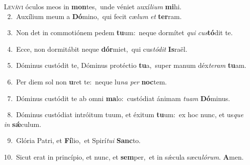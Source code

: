 \lettrine{\initial\textcolor{\initialcolor}{L}}{evávi} óculos meos in \textbf{mon}\-tes,~\star unde véniet auxí\-\textit{li}\-\textit{um} \textbf{mi}\-hi.\\
{\numbfont\textcolor{\numbcolor}{~2.}}~Auxílium meum a \textbf{Dó}\-mino,~\star qui fecit cæ\textit{lum} \textit{et} \textbf{ter}\-ram.\par
{\numbfont\textcolor{\numbcolor}{~3.}}~Non det in commotiónem pedem \textbf{tu}\-um:~\star neque dormítet \textit{qui} \textit{cus}\-\textbf{tó}dit te.\par
{\numbfont\textcolor{\numbcolor}{~4.}}~Ecce, non dormitábit neque \textbf{dór}\-miet,~\star qui cus\-\textit{tó}\-\textit{dit} \textbf{Is}\-raël.\par
{\numbfont\textcolor{\numbcolor}{~5.}}~Dóminus custódit te, Dóminus protéctio \textbf{tu}\-a,~\star super manum déx\-\textit{te}\-\textit{ram} \textbf{tu}\-am.\par
{\numbfont\textcolor{\numbcolor}{~6.}}~Per diem sol non \textbf{u}\-ret te:~\star neque lu\textit{na} \textit{per} \textbf{noc}\-tem.\par
{\numbfont\textcolor{\numbcolor}{~7.}}~Dóminus custódit te ab omni \textbf{ma}\-lo:~\star custódiat ánimam \textit{tu}\-\textit{am} \textbf{Dó}\-minus.\par
{\numbfont\textcolor{\numbcolor}{~8.}}~Dóminus custódiat intróitum tuum, et éxitum \textbf{tu}\-um:~\star ex hoc nunc, et us\textit{que} \textit{in} \textbf{sǽ}\-culum.\par
{\numbfont\textcolor{\numbcolor}{~9.}}~Glória Patri, et \textbf{Fí}\-lio,~\star et Spirí\-\textit{tu}\-\textit{i} \textbf{Sanc}\-to.\par
{\numbfont\textcolor{\numbcolor}{10.}}~Sicut erat in princípio, et nunc, et \textbf{sem}\-per,~\star et in sǽcula sæcu\-\textit{ló}\-\textit{rum}. \textbf{A}\-men.\par

